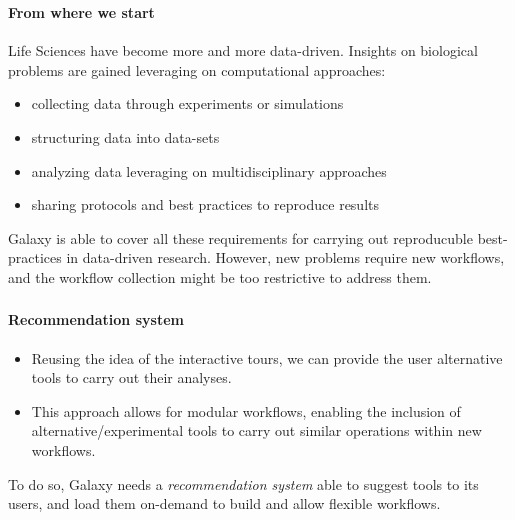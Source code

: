 \documentclass[xcolor=dvipsnames]{beamer}
\newcommand{\cmark}{\ding{51}}%
\begin{document}
%
%
{
\begin{frame}
  \frametitle{\four}
  \framesubtitle{From where we start}
  Life Sciences have become more and more data-driven.\newline\newline
  Insights on biological problems are gained leveraging on computational approaches:
  \vspace{0.2cm}
  \begin{itemize}
    \item collecting data through experiments or simulations \textcolor{ForestGreen}{\cmark}
    \item structuring data into data-sets \textcolor{ForestGreen}{\cmark}
    \item analyzing data leveraging on multidisciplinary approaches \textcolor{ForestGreen}{\cmark}
    \item sharing protocols and best practices to reproduce results \textcolor{ForestGreen}{\cmark}
  \end{itemize}
  \vspace{0.2cm}
  Galaxy is able to cover all these requirements for carrying out reproducuble best-practices in data-driven research.\newline\newline
  However, new problems require new workflows, and the workflow collection might be too restrictive to address them.
\end{frame}
}

\begin{frame}
  \frametitle{\four}
  \framesubtitle{Recommendation system}
  \begin{itemize}
    \item Reusing the idea of the interactive tours, we can provide the user alternative tools to carry out their analyses.
  \end{itemize}
  \begin{itemize}
    \item This approach allows for modular workflows, enabling the inclusion of alternative/experimental tools to carry out similar operations within new workflows.
  \end{itemize}
  \vspace{0.5cm}
  To do so, Galaxy needs a \emph{recommendation system} able to suggest tools to its users, and load them on-demand to build and allow flexible workflows.
\end{frame}
\end{document}
